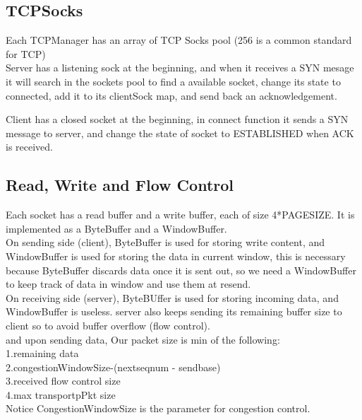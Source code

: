 \documentclass[paper=a4, fontsize=11pt]{scrartcl} %
\numberwithin{equation}{section} %
\numberwithin{figure}{section} %
\numberwithin{table}{section} %
\begin{document}
\subsection{TCPSocks}
Each TCPManager has an array of TCP Socks pool (256 is a common standard for TCP)\\

Server has a listening sock at the beginning, and when it receives a SYN mesage it will search in the sockets pool to find a available socket, change its state to connected, add it to its clientSock map, and send back an acknowledgement. 

Client has a closed socket at the beginning, in connect function it sends a SYN message to server, and change the state of socket to ESTABLISHED when ACK is received.

\subsection{Read, Write and Flow Control}
Each socket has a read buffer and a write buffer, each of size 4*PAGESIZE. It is implemented as a ByteBuffer and a WindowBuffer.\\

On sending side (client), ByteBuffer is used for storing write content, and WindowBuffer is used for storing the data in current window, this is necessary because ByteBuffer discards data once it is sent out, so we need a WindowBuffer to keep track of data in window and use them at resend.\\

On receiving side (server), ByteBUffer is used for storing incoming data, and WindowBuffer is useless. server also keeps sending its remaining buffer size to client so to avoid buffer overflow (flow control).\\

and upon sending data, Our packet size is min of the following: \\
1.remaining data\\
2.congestionWindowSize-(nextseqnum - sendbase) \\
3.received flow control size\\
4.max transportpPkt size\\
Notice CongestionWindowSize is the parameter for congestion control.
\end{document}
